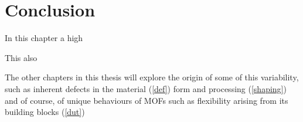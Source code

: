 
\section{Conclusion}

In this chapter a high 

This also 

The other chapters in this thesis will explore the origin of some of
this variability, such as inherent defects in the material (\autoref{def})
form and processing (\autoref{shaping}) and of course, of unique behaviours
of MOFs such as flexibility arising from its building blocks (\autoref{dut})

\FloatBarrier%
\pagebreak